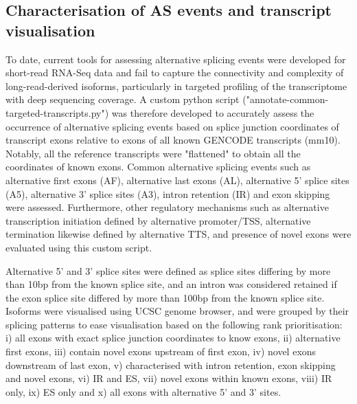 \subsection{Characterisation of AS events and transcript visualisation}
To date, current tools for assessing alternative splicing events were developed for short-read RNA-Seq data and fail to capture the connectivity and complexity of long-read-derived isoforms, particularly in targeted profiling of the transcriptome with deep sequencing coverage. A custom python script ("annotate-common-targeted-transcripts.py") was therefore developed to accurately assess the occurrence of alternative splicing events based on splice junction coordinates of transcript exons relative to exons of all known GENCODE transcripts (mm10). Notably, all the reference transcripts were "flattened" to obtain all the coordinates of known exons. Common alternative splicing events such as alternative first exons (AF), alternative last exons (AL), alternative 5' splice sites (A5), alternative 3' splice sites (A3), intron retention (IR) and exon skipping were assessed. Furthermore, other regulatory mechanisms such as alternative transcription initiation defined by alternative promoter/TSS, alternative termination likewise defined by alternative TTS, and presence of novel exons were evaluated using this custom script.

Alternative 5' and 3' splice sites were defined as splice sites differing by more than 10bp from the known splice site, and an intron was considered retained if the exon splice site differed by more than 100bp from the known splice site. Isoforms were visualised using UCSC genome browser, and were grouped by their splicing patterns to ease visualisation based on the following rank prioritisation: i) all exons with exact splice junction coordinates to know exons, ii) alternative first exons, iii) contain novel exons upstream of first exon, iv) novel exons downstream of last exon, v) characterised with intron retention, exon skipping and novel exons, vi) IR and ES, vii) novel exons within known exons, viii) IR only, ix) ES only and x) all exons with alternative 5' and 3' sites.


